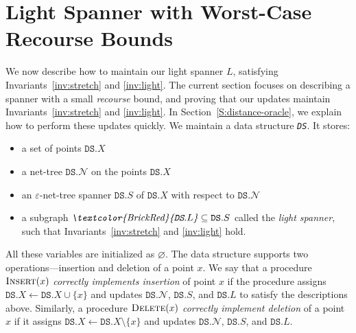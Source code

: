 \documentclass[11pt]{article}
\let\e\varepsilon               %
\def\set#1{\{ #1 \}}
\def\EMPH#1{\emph{\textcolor{BrickRed} {#1}}}
\newcommand{\cN}{\mathcal{N}}
\newcommand{\DS}{\texttt{DS}}
\newcommand{\points}{{\ensuremath{\DS.X}}}
\newcommand{\sparse}{{\ensuremath{\DS.S}}}
\newcommand{\net}{{\ensuremath{\DS.\cN}}}
\newcommand{\light}{{\ensuremath{\DS.L}}}
\begin{document}
\section{Light Spanner with Worst-Case Recourse Bounds}
\label{S:recourse}
%
We now describe how to maintain our light spanner $L$, satisfying Invariants~\ref{inv:stretch} and \ref{inv:light}. The current section focuses on describing a spanner with a small \emph{recourse} bound, and proving that our updates maintain Invariants~\ref{inv:stretch} and \ref{inv:light}. 
In Section~\ref{S:distance-oracle}, we explain how to perform these updates quickly. 
We maintain a data structure \EMPH{\DS}. It stores:
%
\begin{itemize}
    \item a set of points \EMPH{$\points$}
    \item a net-tree \EMPH{$\net$} on the points $\points$
    \item an $\e$-net-tree spanner \EMPH{$\sparse$} of $\points$ with respect to $\net$ 
    \item a subgraph $\EMPH{\light} \subseteq \sparse$ called the \EMPH{light spanner}, such that Invariants~\ref{inv:stretch} and \ref{inv:light} hold.
\end{itemize}
%
All these variables are initialized as $\varnothing$. The data structure supports two operations---insertion and deletion of a point $x$. We say that a procedure $\textsc{Insert}(x)$ \EMPH{correctly implements insertion} of point $x$ if the procedure assigns $\points \gets \points \cup \set{x}$ and updates $\net$, $\sparse$, and $\light$ to satisfy the descriptions above. Similarly, a procedure $\textsc{Delete}(x)$ \EMPH{correctly implement deletion} of a point $x$  if it assigns $\points \gets \points \setminus \set{x}$ and updates $\net$, $\sparse$, and $\light$.
%
\end{document}
